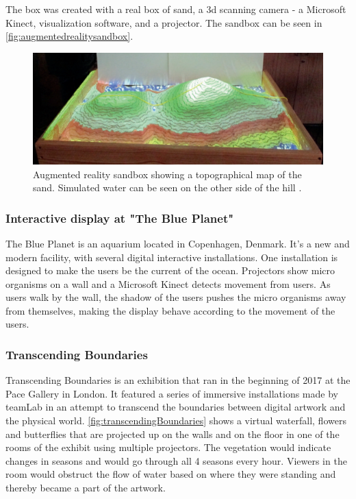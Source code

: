     	    The box was created with a real box of sand, a 3d scanning camera - a Microsoft Kinect,  visualization software, and a projector.  The sandbox can be seen in \autoref{fig:augmentedrealitysandbox}.
	    	\begin{figure}[H]
        		\centering
        		\includegraphics[width=0.9\linewidth]{figure/Analysis/augmentedrealitysandbox.png}
        		\caption{Augmented reality sandbox showing a topographical map of the sand. Simulated water can be seen on the other side of the hill \cite{woods2016pilot}.}
        		\label{fig:augmentedrealitysandbox}
        	\end{figure}
	    
	    \subsubsection{Interactive display at "The Blue Planet"} %
            The Blue Planet is an aquarium located in Copenhagen, Denmark. It's a new and modern facility, with several digital interactive installations. One installation is designed to make the users be the current of the ocean. Projectors show micro organisms on a wall and a Microsoft Kinect detects movement from users. As users walk by the wall, the shadow of the users pushes the micro organisms away from themselves, making the display behave according to the movement of the users.\cite{DenBlaPlanet} 
	

	
	\subsubsection{Transcending Boundaries}\label{sec:transcendingBoundaries} %
        Transcending Boundaries is an exhibition that ran in the beginning of 2017 at the Pace Gallery in London. It featured a series of immersive installations made by teamLab in an attempt to transcend the boundaries between digital artwork and the physical world\cite{transcendingBoundries}. \autoref{fig:transcendingBoundaries} shows a virtual waterfall, flowers and butterflies that are projected up on the walls and on the floor in one of the rooms of the exhibit using multiple projectors. The vegetation would indicate changes in seasons and would go through all 4 seasons every hour. Viewers in the room would obstruct the flow of water based on where they were standing and thereby became a part of the artwork.

